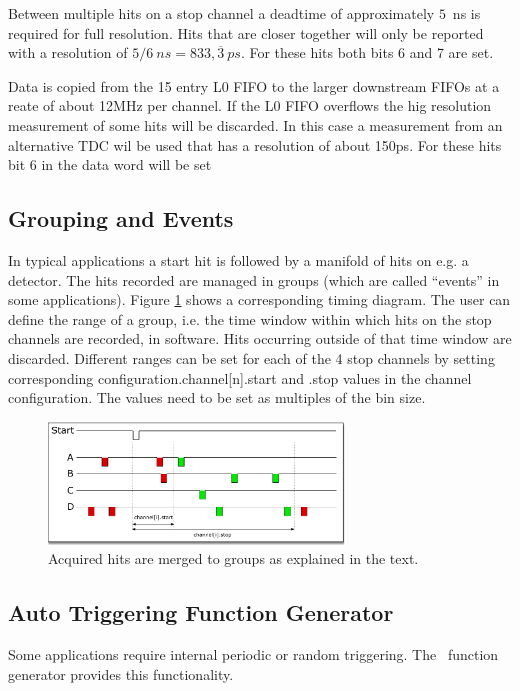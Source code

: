 {			Between multiple hits on a stop channel a deadtime of approximately $5$~ns is required for full resolution. 
			Hits that are closer together will only be reported with a resolution of $5/6~ns = 833,\overline{3}~ps$. For these hits both bits 6 and 7 are set.

			Data is copied from the 15 entry L0 FIFO to the larger downstream FIFOs at a reate of about 12MHz per channel. 
			If the L0 FIFO overflows the hig resolution measurement of some hits will be discarded. 
			In this case a measurement from an alternative TDC wil be used that has a resolution of about 150ps. 
			For these hits bit 6 in the data word will be set
	}

	\subsection{Grouping and Events}
		In typical applications a start hit is followed by a manifold of hits on e.g. a detector. 
		The hits recorded are managed in groups (which are called ``events'' in some applications). 
		Figure \ref{fig:grouping} shows a corresponding timing diagram. The user can define the range of a group, i.e. the time window within which hits 
		on the stop channels are recorded, in software. Hits occurring outside of that time window are discarded. 
		 Different ranges can be set for each of the 4 stop channels by setting corresponding configuration.channel[n].start and .stop values in the channel configuration. 
		The values need to be set as multiples of the bin size.

		\begin{figure}[ht]
			\begin{center}
				\includegraphics[width=0.7\textwidth]{figures/grouping.pdf}
				\caption{Acquired hits are merged to groups as explained in the text.\label{fig:grouping}}
			\end{center}
		\end{figure}
	
	\subsection{Auto Triggering Function Generator\label{cp:AutoTriggeringFunctionGenerator}}
		Some applications require internal periodic or random triggering. The \deviceName\ function generator provides this functionality.\par

